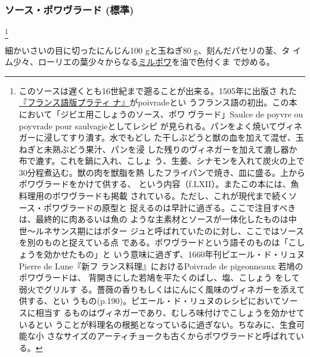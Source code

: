 \begin{recette}
\hypertarget{sauce-poivrade}{%
\subsubsection{ソース・ポワヴラード (標準)}\label{sauce-poivrade}}

\footnote{このソースは遅くとも16世紀まで遡ることが出来る。1505年に出版さ
  れた\href{http://gallica.bnf.fr/ark:/12148/bpt6k792720}{『フランス語版プラティ
  ナ』}がpoivradeとい
  うフランス語の初出。この本において「ジビエ用こしょうのソース、ポワ
  ヴラード」Saulce de poyvre ou poyvrade pour saulvagieとしてレシピ
  が見られる。パンをよく焼いてヴィネガーに浸してすり潰す。水でもどし
  た干しぶどうと獣の血を加えて混ぜ、玉ねぎと未熟ぶどう果汁、パンを浸
  した残りのヴィネガーを加えて漉し器か布で漉す。これを鍋に入れ、こしょ
  う、生姜、シナモンを入れて炭火の上で30分程煮込む。獣の肉を獣脂を熱
  したフライパンで焼き、皿に盛る。上からポワヴラードをかけて供する、
  という内容（f.LXII）。またこの本には、魚料理用のポワヴラードも掲載
  されている。ただし、これが現代まで続くソース・ポワヴラードの原型と
  捉えるのは早計に過ぎる。ここで注目すべきは、最終的に肉あるいは魚の
  ような主素材とソースが一体化したものは中世〜ルネサンス期にはポター
  ジュと呼ばれていたのに対し、ここではソースを別のものと捉えている点
  である。ポワヴラードという語そのものは「こしょうを効かせたもの」と
  いう意味に過ぎず、1660年刊ピエール・ド・リュヌPierre de Lune『新フ
  ランス料理』におけるPoivrade de pigeonneaux 若鳩のポワヴラードは、
  背開きにした若鳩を平たくのばし、塩、こしょう をして弱火でグリルす
  る。薔薇の香りもしくはにんにく風味のヴィネガーを添えて供する、とい
  うもの(p.190)。ピエール・ド・リュヌのレシピにおいてソースに相当す
  るものはヴィネガーであり、むしろ味付けでこしょうを効かせているとい
  うことが料理名の根拠となっているに過ぎない。ちなみに、生食可能な小
  さなサイズのアーティチョークも古くからポワヴラードと呼ばれている。}


細かいさいの目に切ったにんじん100 gと玉ねぎ80 g、刻んだパセリの茎、タ
イム少々、ローリエの葉少々からなる\protect\hyperlink{mirepoix}{ミルポワ}を油で色付くま
で炒める。


\end{recette}
